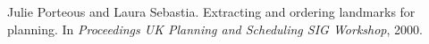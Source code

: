 \begin{thebibliography}{10}
\footnotesize

Julie Porteous and Laura Sebastia.
\newblock Extracting and ordering landmarks for planning.
\newblock In {\em Proceedings UK Planning and Scheduling SIG Workshop}, 2000.
\end{thebibliography}
